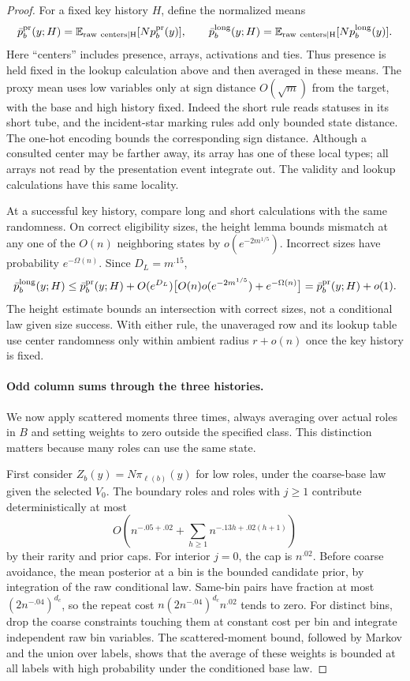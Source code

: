 \begin{proof}
For a fixed key history \(H\), define the normalized means
\[
 \bar p_b^{\rm pr}(y;H)=\mathbb E_{\rm raw\ centers\mid H}
                              [Np_b^{\rm pr}(y)],\qquad
 \bar p_b^{\rm long}(y;H)=\mathbb E_{\rm raw\ centers\mid H}
                              [Np_b^{\rm long}(y)].
\]
Here ``centers'' includes presence, arrays, activations and ties. Thus
presence is held fixed in the lookup calculation above and then averaged
in these means. The proxy mean uses low variables only at sign distance
\(O(\sqrt m)\) from the target, with the base and high history fixed.
Indeed the short rule reads statuses in its short tube, and the
incident-star marking rules add only bounded state distance. The one-hot
encoding bounds the corresponding sign distance. Although a consulted
center may be farther away, its array has one of these local types;
all arrays not read by the presentation event integrate out. The
validity and lookup calculations have this same locality.

At a successful key history, compare long and short calculations with
the same randomness. On correct eligibility sizes, the height lemma
bounds mismatch at any one of the \(O(n)\) neighboring states by
\(o(e^{-2m^{1/5}})\). Incorrect sizes have probability
\(e^{-\Omega(n)}\). Since \(D_L=m^{.15}\),
\[
 \bar p_b^{\rm long}(y;H)
 \le\bar p_b^{\rm pr}(y;H)
   +O(e^{D_L})\bigl[O(n)o(e^{-2m^{1/5}})+e^{-\Omega(n)}\bigr]
 =\bar p_b^{\rm pr}(y;H)+o(1).
\]
The height estimate bounds an intersection with correct sizes, not a
conditional law given size success. With either rule, the unaveraged row
and its lookup table use center randomness only within ambient radius
\(r+o(n)\) once the key history is fixed.

\paragraph{Odd column sums through the three histories.}
We now apply scattered moments three times, always averaging over actual
roles in \(B\) and setting weights to zero outside the specified class.
This distinction matters because many roles can use the same state.

First consider \(Z_b(y)=N\pi_{\ell(b)}(y)\) for low roles, under the
coarse-base law given the selected \(V_0\). The boundary roles and roles
with \(j\ge1\) contribute deterministically at most
\[
 O\left(n^{-.05+.02}+
       \sum_{h\ge1}n^{-.13h+.02(h+1)}\right)
\]
by their rarity and prior caps. For interior \(j=0\), the cap is
\(n^{.02}\). Before coarse avoidance, the mean posterior at a bin is
the bounded candidate prior, by integration of the raw conditional law.
Same-bin pairs have fraction at most \((2n^{-.04})^{d_c}\), so the
repeat cost \(n(2n^{-.04})^{d_c}n^{.02}\) tends to zero. For distinct
bins, drop the coarse constraints touching them at constant cost per
bin and integrate independent raw bin variables. The scattered-moment
bound, followed by Markov and the union over labels, shows that the
average of these weights is bounded at all labels with high probability
under the conditioned base law.


\end{proof}
